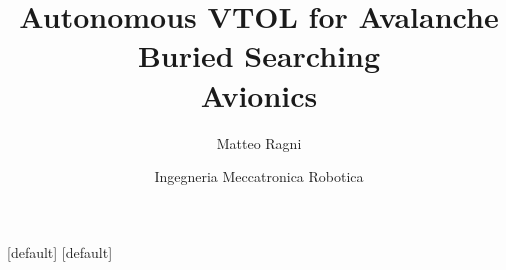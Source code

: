 \usepackage{siunitx}
\usepackage{array}
\usepackage{animate}

\usepackage{tikz}
\usepackage{pgfplots}
\usepackage{tikz-3dplot}
\usetikzlibrary{shapes,arrows,positioning,matrix,,decorations.pathreplacing,3d,calc}
\pgfplotsset{compat=1.11}

\geometry{a5paper,landscape}


[default]
[default]

\title{Autonomous VTOL for Avalanche Buried Searching \\ {\Huge Avionics}}
\author{Matteo Ragni}
\date{Ingegneria Meccatronica Robotica}

\setcounter{tocdepth}{1}

\usepackage{mathpazo}

\newcommand{\newslide}[2]{%
\subsection{#1}
\begin{frame}{#1}
#2
\end{frame}%
}

\newcommand{\newslidenn}[2]{%
\subsection*{#1}
\begin{frame}{#1}
#2
\end{frame}%
}